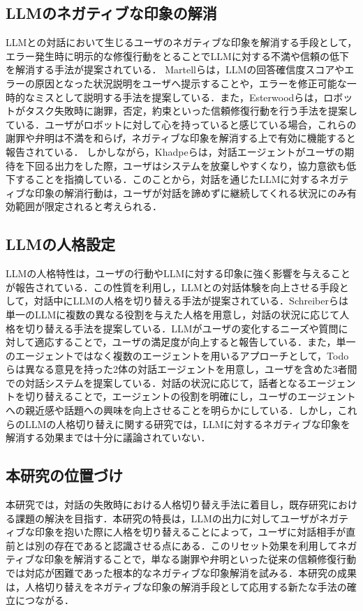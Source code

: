 \documentclass[10pt,twocolumn]{jsarticle}
\begin{document}
\subsection{LLMのネガティブな印象の解消}
LLMとの対話において生じるユーザのネガティブな印象を解消する手段として，エラー発生時に明示的な修復行動をとることでLLMに対する不満や信頼の低下を解消する手法が提案されている． Martellら\cite{Martell2025}は，LLMの回答確信度スコアやエラーの原因となった状況説明をユーザへ提示することや，エラーを修正可能な一時的なミスとして説明する手法を提案している．また，Esterwoodら\cite{Esterwood2023}は，ロボットがタスク失敗時に謝罪，否定，約束といった信頼修復行動を行う手法を提案している．ユーザがロボットに対して心を持っていると感じている場合，これらの謝罪や弁明は不満を和らげ，ネガティブな印象を解消する上で有効に機能すると報告されている． しかしながら，Khadpeら\cite{Khadpe2020}は，対話エージェントがユーザの期待を下回る出力をした際，ユーザはシステムを放棄しやすくなり，協力意欲も低下することを指摘している．このことから，対話を通じたLLMに対するネガティブな印象の解消行動は，ユーザが対話を諦めずに継続してくれる状況にのみ有効範囲が限定されると考えられる．

\subsection{LLMの人格設定}
LLMの人格特性は，ユーザの行動やLLMに対する印象に強く影響を与えることが報告されている\cite{Kroczek2025,Liu2025}．この性質を利用し，LLMとの対話体験を向上させる手段として，対話中にLLMの人格を切り替える手法が提案されている．Schreiberら\cite{Schreiber2024}は単一のLLMに複数の異なる役割を与えた人格を用意し，対話の状況に応じて人格を切り替える手法を提案している．LLMがユーザの変化するニーズや質問に対して適応することで，ユーザの満足度が向上すると報告している．また，単一のエージェントではなく複数のエージェントを用いるアプローチとして，Todoら\cite{Todo2013}は異なる意見を持った2体の対話エージェントを用意し，ユーザを含めた3者間での対話システムを提案している．対話の状況に応じて，話者となるエージェントを切り替えることで，エージェントの役割を明確にし，ユーザのエージェントへの親近感や話題への興味を向上させることを明らかにしている．しかし，これらのLLMの人格切り替えに関する研究では，LLMに対するネガティブな印象を解消する効果までは十分に議論されていない．

\subsection{本研究の位置づけ}
本研究では，対話の失敗時における人格切り替え手法に着目し，既存研究における課題の解決を目指す．本研究の特長は，LLMの出力に対してユーザがネガティブな印象を抱いた際に人格を切り替えることによって，ユーザに対話相手が直前とは別の存在であると認識させる点にある．このリセット効果を利用してネガティブな印象を解消することで，単なる謝罪や弁明といった従来の信頼修復行動では対応が困難であった根本的なネガティブな印象解消を試みる．本研究の成果は，人格切り替えをネガティブな印象の解消手段として応用する新たな手法の確立につながる．
\end{document}

